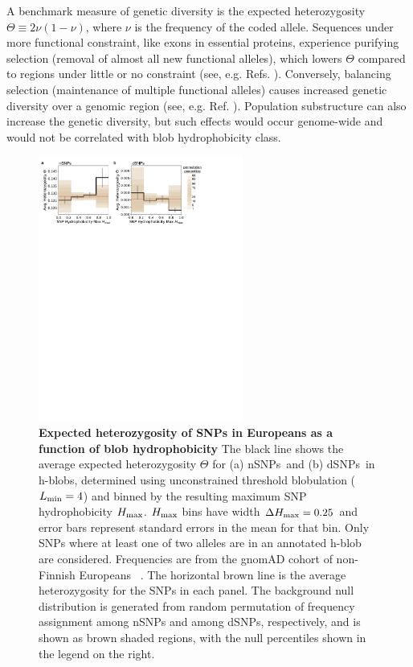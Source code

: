 \documentclass[9pt,twocolumn,twoside,lineno]{pnas-new}
\newcommand{\aucomment}[1]{}
\newcommand{\dSNPs}{dSNPs~}
\newcommand{\nSNPs}{nSNPs~}
\newcommand{\cmax}{H_{\rm max}}
\newcommand{\het}{\Theta}
\newcommand{\Lmin}{L_{\rm min}}
\begin{document}
A benchmark measure of genetic diversity is the expected heterozygosity $\het \equiv 2\nu(1-\nu)$, where $\nu$ is the frequency of the coded allele. Sequences under more functional constraint, like exons in essential proteins, experience purifying selection (removal of almost all new functional alleles), which lowers $\het$ compared to regions under little or no constraint (see, e.g. Refs. \cite{Dickerson1971,Charlesworth1993,Sunyaev2000,Siepel2005,Somel2013}). Conversely, balancing selection (maintenance of multiple functional alleles) causes increased genetic diversity over a genomic region (see, e.g. Ref. \cite{Llaurens2017}). Population substructure can also increase the genetic diversity, but such effects would occur genome-wide and would not be correlated with blob hydrophobicity class.  

\begin{figure}
\includegraphics[width=0.6\textwidth]{fig3.pdf}
\caption{{\bf Expected heterozygosity of SNPs in Europeans as a function of blob hydrophobicity} The black line shows the average expected heterozygosity $\het$ for (a) \nSNPs and (b) \dSNPs in h-blobs, determined using unconstrained threshold blobulation ($\Lmin=4$) and binned by the resulting maximum SNP hydrophobicity $\cmax$. $\cmax$ bins have width $\Delta \cmax=0.25$ and error bars represent standard errors in the mean for that bin. Only SNPs where at least one of two alleles are in an annotated h-blob are considered. Frequencies are  from the gnomAD cohort of non-Finnish Europeans~\cite{Karczewski2021} . The horizontal brown line is the average heterozygosity for the SNPs in each panel. The background null distribution is generated from random permutation of frequency assignment among nSNPs and among dSNPs, respectively, and is shown as brown shaded regions, with the null percentiles shown in the legend on the right.\aucomment{This figure has been updated for readability, same data as original figure} }
\label{fig:het_v_hydromax} 
\end{figure}
\end{document}
